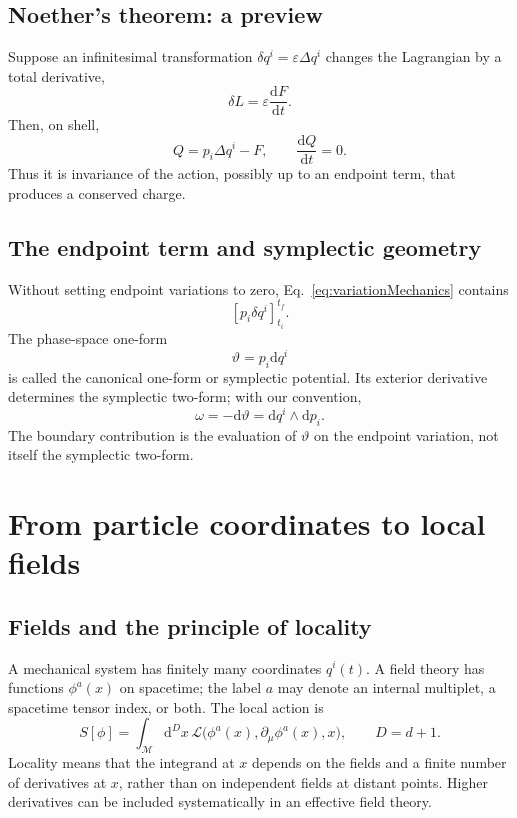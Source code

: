 \documentclass[11pt]{article}
\newcommand{\dd}{\mathrm{d}}
\newcommand{\Lag}{\mathcal{L}}
\newcommand{\cM}{\mathcal{M}}
\begin{document}
\subsection{Noether's theorem: a preview}

Suppose an infinitesimal transformation
\(\delta q^i=\varepsilon\Delta q^i\) changes the Lagrangian by a total
derivative,
\begin{equation}
  \delta L=\varepsilon\frac{\dd F}{\dd t}.
\end{equation}
Then, on shell,
\begin{equation}
  Q=p_i\Delta q^i-F,
  \qquad
  \frac{\dd Q}{\dd t}=0.
  \label{eq:NoetherMechanics}
\end{equation}
Thus it is invariance of the action, possibly up to an endpoint term, that
produces a conserved charge.

\subsection{The endpoint term and symplectic geometry}

Without setting endpoint variations to zero, Eq.~\eqref{eq:variationMechanics}
contains
\begin{equation}
  \left[p_i\delta q^i\right]_{t_i}^{t_f}.
\end{equation}
The phase-space one-form
\begin{equation}
  \vartheta=p_i\dd q^i
  \label{eq:symplecticPotential}
\end{equation}
is called the canonical one-form or symplectic potential. Its exterior
derivative determines the symplectic two-form; with our convention,
\begin{equation}
  \omega=-\dd\vartheta=\dd q^i\wedge\dd p_i.
\end{equation}
The boundary contribution is the evaluation of \(\vartheta\) on the endpoint
variation, not itself the symplectic two-form.

\section{From particle coordinates to local fields}

\subsection{Fields and the principle of locality}

A mechanical system has finitely many coordinates \(q^i(t)\). A field theory
has functions \(\phi^a(x)\) on spacetime; the label \(a\) may denote an
internal multiplet, a spacetime tensor index, or both. The local action is
\begin{equation}
  S[\phi]=\int_\cM \dd^D x\,
  \Lag\bigl(\phi^a(x),\partial_\mu\phi^a(x),x\bigr),
  \qquad D=d+1.
  \label{eq:fieldAction}
\end{equation}
Locality means that the integrand at \(x\) depends on the fields and a finite
number of derivatives at \(x\), rather than on independent fields at distant
points. Higher derivatives can be included systematically in an effective
field theory.
\end{document}
